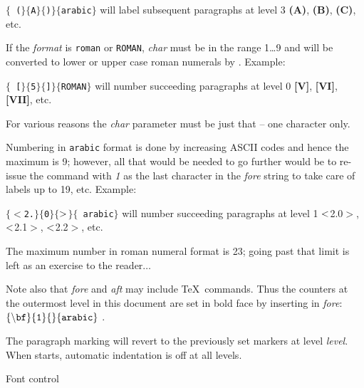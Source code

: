 \incindent

$\{${\tt %
(}$\}\{${\tt A}$\}\{${\tt )}$\}\{${\tt arabic}$\}$ will label subsequent 
paragraphs at level 3 {\bf (A)}, {\bf (B)}, {\bf(C)}, etc.

\decindent

If the 
{\it format} is {\tt roman} or {\tt ROMAN}, {\it char} must be in the range
1\dots9 and will be converted to lower or upper case roman numerals by
\texview.   Example:

\incindent

$\{\!${\tt %
\tt[}$\}\{${\tt 5}$\}\{${\tt ]}$\!\}\{${\tt ROMAN}$\}$ will number succeeding
paragraphs at level 0 {\bf [V]}, {\bf [VI]}, {\bf [VII]}, etc.

\decindent

For various reasons the {\it char} parameter must be just that -- one character
only.

\filbreak

Numbering in {\tt arabic} format is done by increasing ASCII codes and hence
the maximum is 9; however, all that would be needed to go further would be to
re-issue the  command with {\it 1} as the last character
in the {\it fore} string to take care of labels up to 19, etc.  Example:

\incindent

$\{${$<$\tt2.}$\}\{${\tt 0}$\}\{${$\tt>$}$\}\{${\tt
arabic}$\}$ will number succeeding paragraphs at level 1 {$\bf<$2.0$>$}, 
{$\bf<$2.1$>$}, {$\bf<$2.2$>$}, etc. 

\decindent

The maximum number in roman numeral format is 23; going past that limit is left
as an exercise to the reader$\ldots$ 

\incindent

Note also that {\it fore} and {\it aft} may include \TeX\ commands.
Thus the counters at the outermost level in this document are set in bold
face by inserting  in {\it fore}: 
$\{\backslash{\tt bf}\}\{{\tt1}\}\{{}\}\{{\tt
arabic}\}$ .

\decindent
\filbreak

 The paragraph marking will revert to the previously
set markers at level {\it level}.  When {\texview} starts, automatic 
indentation is off at all levels.



\filbreak Font control

